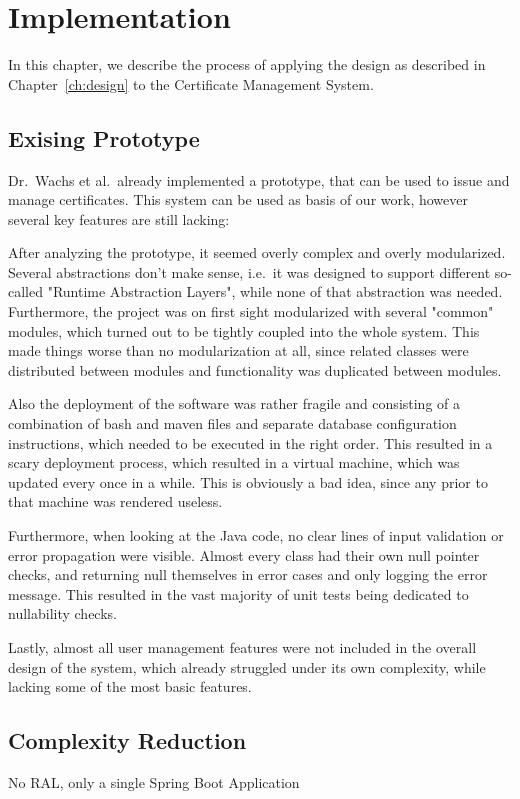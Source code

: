 \chapter{Implementation}\label{ch:implementation}
In this chapter, we describe the process of applying the design as described in Chapter~\ref{ch:design} to the
Certificate Management System.

\section{Exising Prototype}\label{sec:exisingPrototype}
Dr.\ Wachs et al.\ already implemented a prototype, that can be used to issue and manage certificates.
This system can be used as basis of our work, however several key features are still lacking:

After analyzing the prototype, it seemed overly complex and overly modularized.
Several abstractions don't make sense, i.e.\ it was designed to support different so-called "Runtime Abstraction
Layers", while none of that abstraction was needed.
Furthermore, the project was on first sight modularized with several "common" modules, which turned out to be tightly
coupled into the whole system.
This made things worse than no modularization at all, since related classes were distributed between modules and
functionality was duplicated between modules.

Also the deployment of the software was rather fragile and consisting of a combination of bash and maven files and
separate database configuration instructions, which needed to be executed in the right order.
This resulted in a scary deployment process, which resulted in a virtual machine, which was updated every once in a
while.
This is obviously a bad idea, since any  prior to that machine was rendered useless.

Furthermore, when looking at the Java code, no clear lines of input validation or error propagation were visible.
Almost every class had their own null pointer checks, and returning null themselves in error cases and only logging the
error message.
This resulted in the vast majority of unit tests being dedicated to nullability checks.

Lastly, almost all user management features were not included in the overall design of the system, which already
struggled under its own complexity, while lacking some of the most basic features.

\section{Complexity Reduction}\label{sec:complexityReduction}
No RAL, only a single Spring Boot Application


